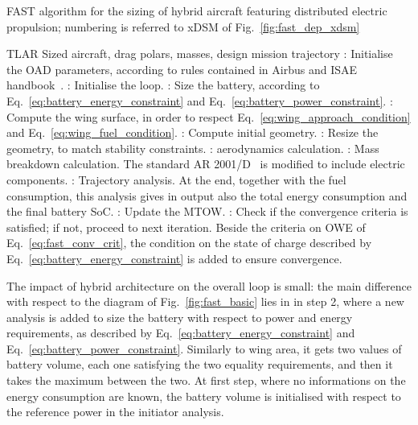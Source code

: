 \begin{algorithm}[!h]
	\caption{FAST algorithm for the sizing of hybrid aircraft featuring distributed electric propulsion; numbering is referred to xDSM of Fig.~\ref{fig:fast_dep_xdsm}}
	\label{alg:fast_dep}
	\begin{algorithmic}
		\REQUIRE TLAR
		\ENSURE Sized aircraft, drag polars, masses, design mission trajectory
		: Initialise the OAD parameters, according to rules contained in Airbus and ISAE handbook~\cite{bib:airbus_notes}.
		\REPEAT
		: Initialise the loop.  
		: Size the battery, according to Eq.~\eqref{eq:battery_energy_constraint} and Eq.~\eqref{eq:battery_power_constraint}.
		: Compute the wing surface, in order to respect Eq.~\eqref{eq:wing_approach_condition} and Eq.~\eqref{eq:wing_fuel_condition}.
		: Compute initial geometry.
		: Resize the geometry, to match stability constraints.
		: aerodynamics calculation.
		: Mass breakdown calculation. The standard AR 2001/D~\cite{bib:mass_breakdown} is modified to include electric components. 
		: Trajectory analysis. 
		At the end, together with the fuel consumption, this analysis gives in output also the total energy consumption and the final battery SoC. 
		: Update the MTOW.
		: Check if the convergence criteria is satisfied; if not, proceed to next iteration. 
		Beside the criteria on OWE of Eq.~\eqref{eq:fast_conv_crit}, the condition on the state of charge described by Eq.~\eqref{eq:battery_energy_constraint} is added to ensure convergence. 
	\end{algorithmic}
\end{algorithm}
The impact of hybrid architecture on the overall loop is small: the main difference with respect to the diagram of Fig.~\ref{fig:fast_basic} lies in in step 2, where a new analysis is added to size the battery with respect to power and energy requirements, as described by Eq.~\eqref{eq:battery_energy_constraint} and Eq.~\eqref{eq:battery_power_constraint}. 
Similarly to wing area, it gets two values of battery volume, each one satisfying the two equality requirements, and then it takes the maximum between the two. 
At first step, where no informations on the energy consumption are known, the battery volume is initialised with respect to the reference power in the initiator analysis.   

